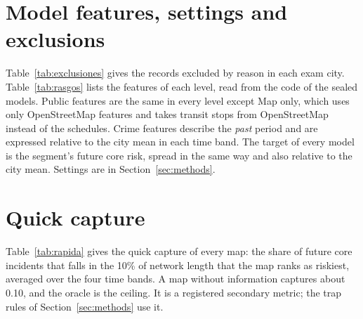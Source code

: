 \documentclass[preprint,12pt,authoryear]{elsarticle}
\newcommand{\ajustar}[1]{\adjustbox{max width=\textwidth}{#1}}
\begin{document}



\appendix
\renewcommand{\theHtable}{app.\thetable}
\section{Model features, settings and exclusions}\label{app:modelo}
Table~\ref{tab:exclusiones} gives the records excluded by reason in each exam city. Table~\ref{tab:rasgos} lists the features of each level, read from the code of the sealed models. Public features are the same in every level except Map only, which uses only OpenStreetMap features and takes transit stops from OpenStreetMap instead of the schedules. Crime features describe the \emph{past} period and are expressed relative to the city mean in each time band. The target of every model is the segment's future core risk, spread in the same way and also relative to the city mean. Settings are in Section~\ref{sec:methods}.

\begin{table}[H]
\centering\small
\caption{Exam records in the study period (January 2024 to August 2026) by reason for exclusion. Institutions are prisons, hospitals, police stations and social facilities mapped in OpenStreetMap.}
\label{tab:exclusiones}
\ajustar{}
\end{table}

\begin{table}[p]
\centering\scriptsize
\caption{Features by data-availability level (B = Detailed, A = Core only, C = Coarse, Total = City total, None = No crime data, Map = Map only). Distances are measured from the midpoint of the segment.}
\label{tab:rasgos}

\end{table}

\section{Quick capture}\label{app:rapida}
Table~\ref{tab:rapida} gives the quick capture of every map: the share of future core incidents that falls in the 10\% of network length that the map ranks as riskiest, averaged over the four time bands. A map without information captures about 0.10, and the oracle is the ceiling. It is a registered secondary metric; the trap rules of Section~\ref{sec:methods} use it.
\end{document}
